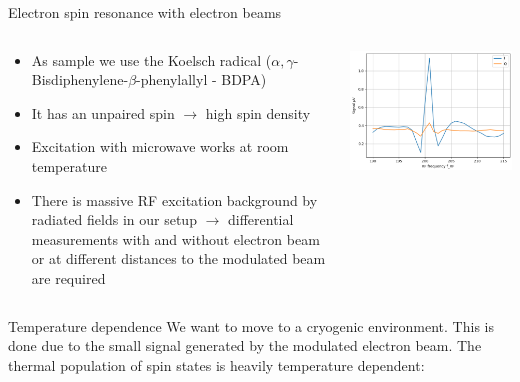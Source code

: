 \documentclass[final]{beamer}
\begin{document}
\begin{frame}[fragile]{}
\begin{columns}[T]
\begin{column}{.49\linewidth}
\begin{block}{\large Electron spin resonance with electron beams}
        \begin{columns}
          \begin{column}{0.6\columnwidth}
            \begin{itemize}
              \item As sample we use the Koelsch radical ($\alpha,\gamma$-Bisdiphenylene-$\beta$-phenylallyl - BDPA)
              \item It has an unpaired spin $\to$ high spin density
              \item Excitation with microwave works at room temperature
              \item There is massive RF excitation background by radiated fields in our setup $\to$ differential measurements with and
                    without electron beam or at different distances to the modulated beam are required
            \end{itemize}
          \end{column}
          \begin{column}{0.4\columnwidth}
            \includegraphics[width=\columnwidth]{figures/eprsignal.png}
          \end{column}
        \end{columns}
      \end{block}

      \begin{block}{\large Temperature dependence}
        We want to move to a cryogenic environment. This is done due to the small signal generated by the modulated electron beam.
        The thermal population of spin states is heavily temperature dependent:
        

\end{block}
\end{column}
\end{columns}
\end{frame}
\end{document}
